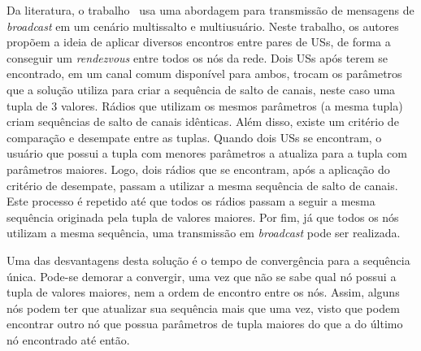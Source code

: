 



Da literatura, o trabalho~\cite{jumpstay} usa uma abordagem para transmissão de mensagens de {\it broadcast} em um cenário multissalto e multiusuário. Neste trabalho, os autores propõem a ideia de aplicar diversos encontros entre pares de USs, de forma a conseguir um {\it rendezvous} entre todos os nós da rede. Dois USs após terem se encontrado, em um canal comum disponível para ambos, trocam os parâmetros que a solução utiliza para criar a sequência de salto de canais, neste caso uma tupla de 3 valores. Rádios que utilizam os mesmos parâmetros (a mesma tupla) criam sequências de salto de canais idênticas. Além disso, existe um critério de comparação e desempate entre as tuplas. Quando dois USs se encontram, o usuário que possui a tupla com menores parâmetros a atualiza para a tupla com parâmetros maiores. Logo, dois rádios que se encontram, após a aplicação do critério de desempate, passam a utilizar a mesma sequência de salto de canais. Este processo é repetido até que todos os rádios passam a seguir a mesma sequência originada pela tupla de valores maiores. Por fim, já que todos os nós utilizam a mesma sequência, uma transmissão em {\it broadcast} pode ser realizada.

Uma das desvantagens desta solução é o tempo de convergência para a sequência única. Pode-se demorar a convergir, uma vez que não se sabe qual nó possui a tupla de valores maiores, nem a ordem de encontro entre os nós. Assim, alguns nós podem ter que atualizar sua sequência mais que uma vez, visto que podem encontrar outro nó que possua parâmetros de tupla maiores do que a do último nó encontrado até então.   

